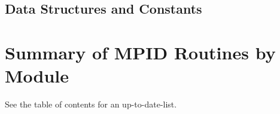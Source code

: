 \documentclass[dvipdfm]{article}
\begin{document}
\subsection{Data Structures and Constants}

%
%

\section{Summary of MPID Routines by Module}

See the table of contents for an up-to-date-list.




\end{document}
